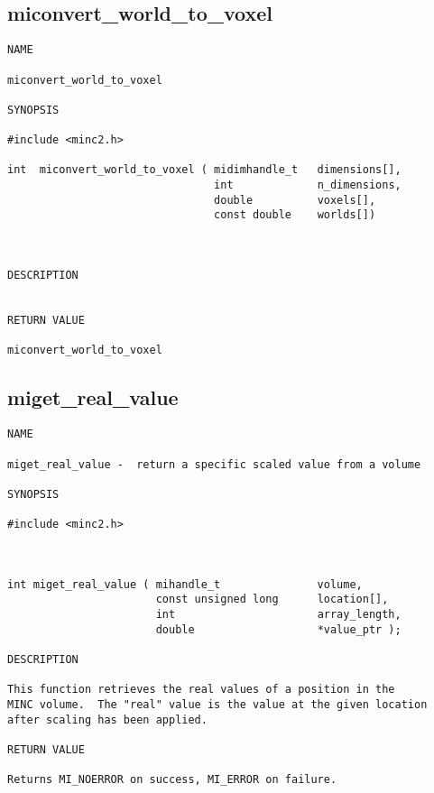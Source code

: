\documentclass{article}
\begin{document}
\subsection{miconvert\_world\_to\_voxel}
\begin{verbatim}
NAME 

miconvert_world_to_voxel

SYNOPSIS

#include <minc2.h>

int  miconvert_world_to_voxel ( midimhandle_t   dimensions[],
                                int             n_dimensions,
                                double          voxels[],
                                const double    worlds[])
                                   
                       
                                
DESCRIPTION


RETURN VALUE

miconvert_world_to_voxel
\end{verbatim}

\subsection{miget\_real\_value}
\begin{verbatim}
NAME

miget_real_value -  return a specific scaled value from a volume

SYNOPSIS

#include <minc2.h>



int miget_real_value ( mihandle_t               volume,
                       const unsigned long      location[],
                       int                      array_length,
                       double                   *value_ptr );

DESCRIPTION

This function retrieves the real values of a position in the
MINC volume.  The "real" value is the value at the given location 
after scaling has been applied.

RETURN VALUE

Returns MI_NOERROR on success, MI_ERROR on failure.
\end{verbatim}
\end{document}
